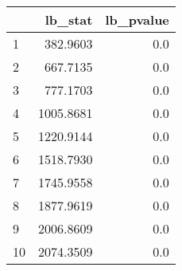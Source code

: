 \begin{tabular}{lrr}
\toprule
{} &    lb\_stat &  lb\_pvalue \\
\midrule
1  &   382.9603 &        0.0 \\
2  &   667.7135 &        0.0 \\
3  &   777.1703 &        0.0 \\
4  &  1005.8681 &        0.0 \\
5  &  1220.9144 &        0.0 \\
6  &  1518.7930 &        0.0 \\
7  &  1745.9558 &        0.0 \\
8  &  1877.9619 &        0.0 \\
9  &  2006.8609 &        0.0 \\
10 &  2074.3509 &        0.0 \\
\bottomrule
\end{tabular}
